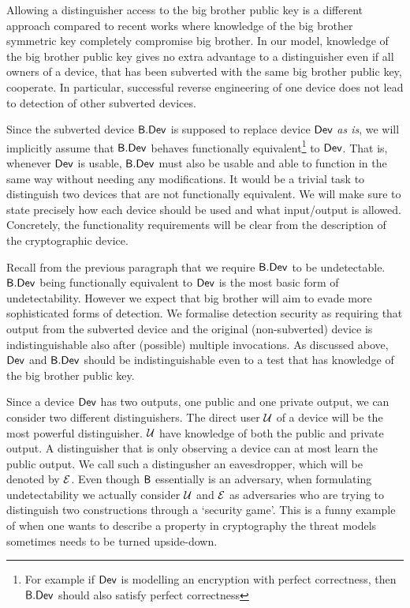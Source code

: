 Allowing a distinguisher access to the big brother public key is a different approach compared to recent works \cite{DBLP:secSym,cryptoeprint:2015:517,DBLP:conf/eurocrypt/DodisGGJR15,cryptoeprint:2015:683} where knowledge of the big brother symmetric key completely compromise big brother. In our model, knowledge of the big brother public key gives no extra advantage to a distinguisher even if all owners of a device, that has been subverted with the same big brother public key, cooperate.  In particular, successful reverse engineering of one device does not lead to detection of other subverted devices. 

Since the subverted device $\mathsf{B}.\mathsf{Dev}$ is supposed to replace device $\operatorname{\mathsf{Dev}}$ \emph{as is}, we will implicitly assume that $\mathsf{B}.\mathsf{Dev}$ behaves functionally equivalent\footnote{For example if $\operatorname{\mathsf{Dev}}$ is modelling an encryption with perfect correctness, then $\mathsf{B}.\mathsf{Dev}$ should also satisfy perfect correctness} to $\operatorname{\mathsf{Dev}}$. That is, whenever $\operatorname{\mathsf{Dev}}$ is usable, $\mathsf{B}.\mathsf{Dev}$ must also be usable and able to function in the same way without needing any modifications. It would be a trivial task to distinguish two devices that are not functionally equivalent. We will make sure to state precisely how each device should be used and what input/output is allowed. Concretely, the functionality requirements will be clear from the description of the cryptographic device. 

Recall from the previous paragraph that we require $\mathsf{B}.\mathsf{Dev}$ to be undetectable. $\mathsf{B}.\mathsf{Dev}$ being functionally equivalent to $\operatorname{\mathsf{Dev}}$ is the most basic form of undetectability. However we expect that big brother will aim to evade more sophisticated forms of detection. We formalise detection security as requiring that output from the subverted device and the original (non-subverted) device is indistinguishable also after (possible) multiple invocations. As discussed above, $\operatorname{\mathsf{Dev}}$ and $\mathsf{B}.\mathsf{Dev}$ should be indistinguishable even to a test that has knowledge of the big brother public key.

Since a device $\operatorname{\mathsf{Dev}}$ has two outputs, one public and one private output, we can consider two different distinguishers. The direct user $\mathcal{U}$ of a device will be the most powerful distinguisher. $\mathcal{U}$ have knowledge of both the public and private output. A distinguisher that is only observing a device can at most learn the public output. We call such a distingusher an eavesdropper, which will be denoted by $\mathcal{E}$. Even though $\mathsf{B}$ essentially is an adversary, when formulating undetectability we actually consider $\mathcal{U}$ and $\mathcal{E}$ as adversaries who are trying to distinguish two constructions through a `security game'. This is a funny example of when one wants to describe a property in cryptography the threat models sometimes needs to be turned upside-down. 

